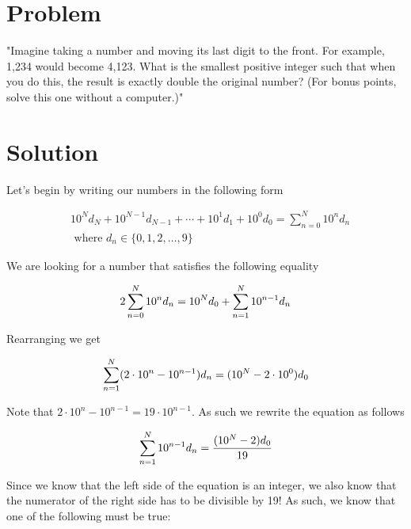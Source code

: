 \documentclass[a4paper,12pt]{article}
\begin{document}
\section{Problem}

"Imagine taking a number and moving its last digit to the front.
For example, 1,234 would become 4,123. What is the smallest positive 
integer such that when you do this, the result is exactly double the 
original number? (For bonus points, solve this one without a 
computer.)"

\section{Solution}

Let's begin by writing our numbers in the following form\smallskip

\begin{equation}
\begin{aligned}
\label{eq:5} & 10^Nd_N+10^{N-1}d_{N-1}+\cdots+10^1d_1+10^0d_0 = 
\sum^N_{n=0}10^nd_n \\ & \mbox{ where }d_n \in \{0,1,2,\ldots,9\}
\end{aligned}
\end{equation}
\smallskip

\noindent We are looking for a number that satisfies the following 
equality\smallskip

\begin{equation}
2\sum^N_{n=0}10^nd_n=10^Nd_0+\sum^N_{n=1}10^{n-1}d_n\smallskip
\end{equation}

\noindent Rearranging we get\smallskip

\begin{equation}
\sum^N_{n=1}(2 \cdot 10^n-10^{n-1})d_n=(10^N-2 \cdot 10^0)d_0\smallskip
\end{equation}

\noindent Note that $2 \cdot 10^n-10^{n-1}=19 \cdot 10^{n-1}$.  As such we 
rewrite the equation as follows\smallskip

\begin{equation} \label{eq:3}
\sum^N_{n=1}10^{n-1}d_n=\frac{(10^N-2)d_0}{19}\smallskip
\end{equation}

\noindent Since we know that the left side of the equation is an integer, we 
also know that the numerator of the right side has to be divisible by 19!  
As such, we know that one of the following must be true:\smallskip
\end{document}
